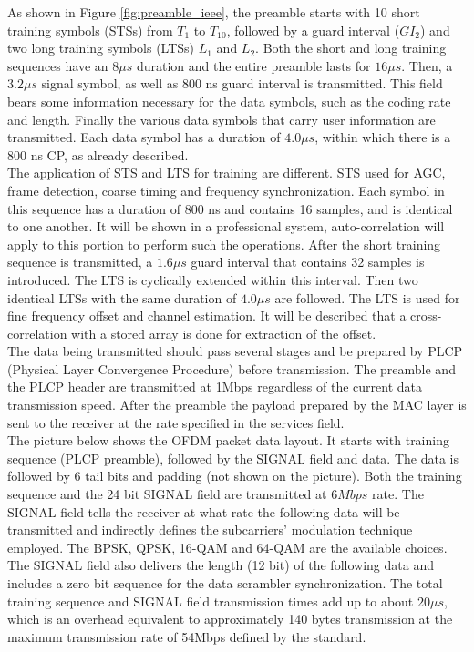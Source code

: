 As shown in Figure \ref{fig:preamble_ieee}, the preamble starts with 10 short training symbols (STSs) from $T_{1}$ to $T_{10}$, followed by a guard interval ($GI_{2}$) and two long training symbols (LTSs) $L_{1}$ and $L_{2}$. Both the short and long training sequences have an $8 \mu s$ duration and the entire preamble lasts for $16 \mu s$. Then, a $3.2 \mu s$ signal symbol, as well as 800 ns guard interval is transmitted. This field bears some information necessary for the data symbols, such as the coding rate and length. Finally the various data symbols that carry user information are transmitted. Each data symbol has a duration of $4.0 \mu s$, within which there is a 800 ns CP, as already described.\\
The application of STS and LTS for training are different. STS used for AGC, frame detection, coarse timing and frequency synchronization. Each symbol in this sequence has a duration of 800 ns and contains 16 samples, and is identical to one another.
 It will be shown in a professional system, auto-correlation will apply to this portion to perform such the operations. After the short training sequence is transmitted, a $1.6 \mu s$ guard interval that contains 32 samples is introduced. The LTS is cyclically extended within this interval. Then two identical LTSs with the same duration of $4.0 \mu s$ are followed. The LTS is used for fine frequency offset and channel estimation. It will be described that a cross-correlation with a stored array is done for extraction of the offset.\\
The data being transmitted should pass several stages and be prepared by PLCP (Physical Layer Convergence Procedure) before transmission. The preamble and the PLCP header are transmitted at 1Mbps regardless of the current data transmission speed. After the preamble the payload prepared by the MAC layer is sent to the receiver at the rate specified in the services field.\\
The picture below shows the OFDM packet data layout. It starts with training sequence (PLCP preamble), followed by the SIGNAL field and data. The data is followed by 6 tail bits and padding (not shown on the picture). Both the training sequence and the 24 bit SIGNAL field are transmitted at $6 Mbps$ rate. The SIGNAL field tells the receiver at what rate the following data will be transmitted and indirectly defines the subcarriers' modulation technique employed. The BPSK, QPSK, 16-QAM and 64-QAM are the available choices. The SIGNAL field also delivers the length (12 bit) of the following data and includes a zero bit sequence for the data scrambler synchronization. The total training sequence and SIGNAL field transmission times add up to about $20 \mu s$, which is an overhead equivalent to approximately 140 bytes transmission at the maximum transmission rate of 54Mbps defined by the standard.\\


